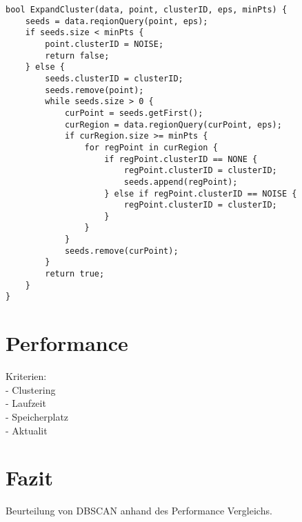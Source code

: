 \documentclass{lni}
\begin{document}
\begin{lstlisting}[caption={ExpandCluster},label={lst:expcluster}]
bool ExpandCluster(data, point, clusterID, eps, minPts) {
    seeds = data.reqionQuery(point, eps);
    if seeds.size < minPts {
        point.clusterID = NOISE;
        return false;
    } else {
        seeds.clusterID = clusterID;
        seeds.remove(point);
        while seeds.size > 0 {
            curPoint = seeds.getFirst();
            curRegion = data.regionQuery(curPoint, eps);
            if curRegion.size >= minPts {
                for regPoint in curRegion {
                    if regPoint.clusterID == NONE {
                        regPoint.clusterID = clusterID;
                        seeds.append(regPoint);
                    } else if regPoint.clusterID == NOISE {
                        regPoint.clusterID = clusterID;
                    }
                }
            }
            seeds.remove(curPoint);
        }
        return true;
    }
}
\end{lstlisting}

%
%

\section{Performance}
\label{sec:perf}

Kriterien:\\
- Clustering\\
- Laufzeit\\
- Speicherplatz\\
- Aktualit\\

\cite{REV} \cite{REVREV} \cite{PPF}

%
%

\section{Fazit}
\label{sec:fazit}

Beurteilung von DBSCAN anhand des Performance Vergleichs.


\end{document}

